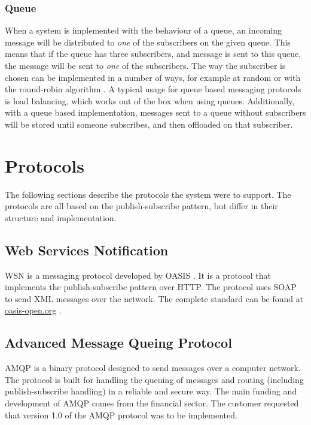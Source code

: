 \subsubsection{Queue}
When a system is implemented with the behaviour of a queue, an incoming message will be distributed to \textit{one} of the subscribers on the given queue. This means that if the queue has three subscribers, and message is sent to this queue, the message will be sent to \textit{one} of the subscribers. The way the subscriber is chosen can be implemented in a number of ways, for example at random or with the round-robin algorithm \cite{round-robin}. A typical usage for queue based messaging protocols is load balancing, which works out of the box when using queues. Additionally, with a queue based implementation, messages sent to a queue without subscribers will be stored until someone subscribes, and then offloaded on that subscriber.

\section{Protocols}
\label{prestudies-protocols}

The following sections describe the protocols the system were to support. The protocols are all based on the publish-subscribe pattern, but differ in their structure and implementation.

\subsection{Web Services Notification}
\label{subsec:prestudies-wsnotification}

WSN is a messaging protocol developed by OASIS \cite{oasis}. It is a protocol that implements the publish-subscribe pattern over HTTP. The protocol uses SOAP to send XML messages over the network. The complete standard can be found at \url{oasis-open.org} \cite{wsn-basenotification}.

\subsection{Advanced Message Queing Protocol}
\label{subsec:prestudies-amqp}
AMQP is a binary protocol designed to send messages over a computer network. The protocol is built for handling the queuing of messages and routing (including publish-subscribe handling) in a reliable and secure way. The main funding and development of AMQP comes from the financial sector. The customer requested that version 1.0 of the AMQP protocol was to be implemented.

